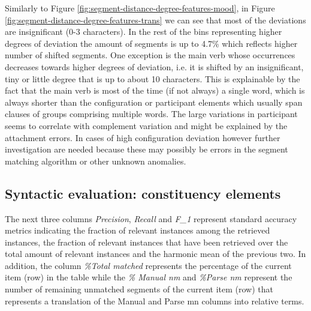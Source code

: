     Similarly to Figure \ref{fig:segment-distance-degree-features-mood}, in Figure \ref{fig:segment-distance-degree-features-trans} we can see that most of the deviations are insignificant (0-3 characters). In the rest of the bins representing higher degrees of deviation the amount of segments is up to 4.7\% which reflects higher number of shifted segments. One exception is the main verb whose occurrences decreases towards higher degrees of deviation, i.e. it is shifted by an insignificant, tiny or little degree that is up to about 10 characters. This is explainable by the fact that the main verb is most of the time (if not always) a single word, which is always shorter than the configuration or participant elements which usually span clauses of groups comprising multiple words. The large variations in participant seems to correlate with complement variation and might be explained by the attachment errors. In cases of high configuration deviation however further investigation are needed because these may possibly be errors in the segment matching algorithm or other unknown anomalies.

\subsection{Syntactic evaluation: constituency elements}
\label{sec:syntactic-constituents}
    
    The next three columns \textit{Precision}, \textit{Recall} and \textit{F_1} represent standard accuracy metrics indicating the fraction of relevant instances among the retrieved instances, the fraction of relevant instances that have been retrieved over the total amount of relevant instances and the harmonic mean of the previous two. In addition, the column \textit{\%Total matched} represents the percentage of the current item (row) in the table while the \textit{\% Manual nm} and \textit{\%Parse nm} represent the number of remaining unmatched segments of the current item (row) that represents a translation of the Manual and Parse mn columns into relative terms. 


